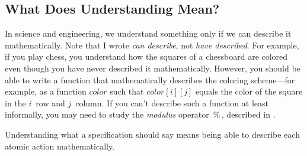 \documentclass[fleqn,leqno]{article}
\begin{document}
%
\vspace{-2\baselineskip}%
\subsection*{What Does Understanding Mean?}

In science and engineering, we understand something only if we can
describe it mathematically.  Note that I wrote \emph{can describe},
not \emph{have described}.  For example, if you play chess, you
understand how the squares of a chessboard are colored even though you
have never described it mathematically.  However, you should be able
to write a function that mathematically describes the coloring
scheme---for example, as a function $color$ such that $color[i][j]$ equals the
color of the square in the $i$\tth\ row and $j$\tth\ column.  If you
can't describe such a function at least informally, you may need to
study the \emph{modulus} operator $\,\%\,$, described in
 .


\medskip\noindent
%
Understanding what a specification should say means being able to
describe each atomic action mathematically.
\end{document}
